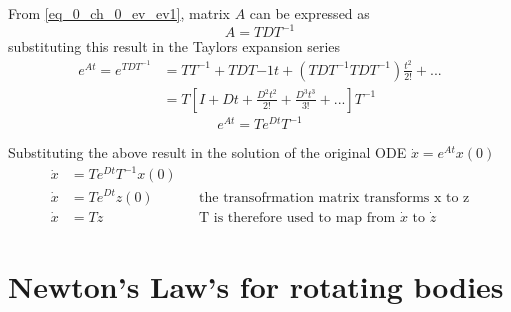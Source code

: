 From \eqref{eq_0_ch_0_ev_ev1}, matrix $A$ can be expressed as
\begin{equation}
	A = TDT^{-1}
\end{equation}
substituting this result in the Taylors expansion series
\begin{align*}
	e^{At} = e^{TDT^{-1}} &= TT^{-1} + TDT{-1}t + (TDT^{-1}TDT^{-1})\frac{t^{2}}{2!} + ... \\
						  &= T[I + Dt + \frac{D^{2}t^{2}}{2!} + \frac{D^{3}t^{3}}{3!}+ ...]T^{-1}
\end{align*}
\begin{equation}
	e^{At} = T e^{Dt} T^{-1}
\end{equation}

Substituting the above result in the solution of the original ODE $\dot{x} = e^{At}x(0)$
\begin{align*}
	\dot{x} &= T e^{Dt} T^{-1} x(0) \\
	\dot{x}	&= T e^{Dt} z(0) && \text{the transofrmation matrix transforms x to z} \\
	\dot{x} &= T \dot{z} && \text{T is therefore used to map from }\dot{x} \text{ to } \dot{z}
\end{align*}

\section{Newton's Law's for rotating bodies}

